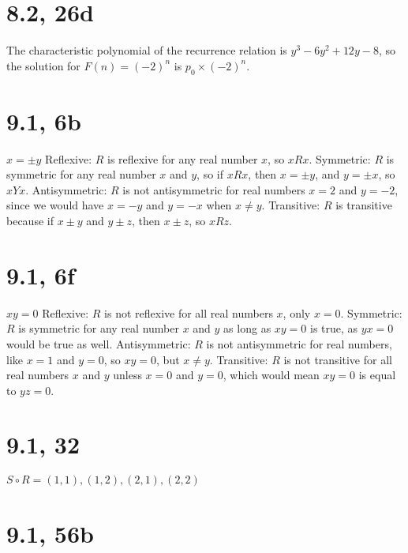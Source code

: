 \documentclass{article}
\begin{document}
\section{8.2, 26d}
The characteristic polynomial of the recurrence relation is $y^3 - 6y^2 + 12y - 8$, so the solution for $F(n) = (-2)^n$ is $p_0 \times (-2)^n$.

\section{9.1, 6b}
$x = \pm y$
\newline
Reflexive:
\newline
$R$ is reflexive for any real number $x$, so $xRx$.
\newline
Symmetric:
\newline
$R$ is symmetric for any real number $x$ and $y$, so if $xRx$, then $x = \pm y$, and $y = \pm x$, so $xYx$.
\newline
Antisymmetric:
\newline
$R$ is not antisymmetric for real numbers $x = 2$ and $y = -2$, since we would have $x = -y$ and $y = -x$ when $x \neq y$.
\newline
Transitive:
\newline
$R$ is transitive because if $x \pm y$ and $y \pm z$, then $x \pm z$, so $xRz$.

\section{9.1, 6f}
$xy = 0$
\newline
Reflexive:
\newline
$R$ is not reflexive for all real numbers $x$, only $x = 0$.
\newline
Symmetric:
\newline
$R$ is symmetric for any real number $x$ and $y$ as long as $xy = 0$ is true, as $yx = 0$ would be true as well.
\newline
Antisymmetric:
\newline
$R$ is not antisymmetric for real numbers, like $x = 1$ and $y = 0$, so $xy = 0$, but $x \neq y$.
\newline
Transitive:
\newline
$R$ is not transitive for all real numbers $x$ and $y$ unless $x = 0$ and $y = 0$, which would mean $xy = 0$ is equal to $yz = 0$.

\section{9.1, 32}
$S \circ R = {(1, 1), (1, 2), (2, 1), (2, 2)}$

\section{9.1, 56b}
\end{document}
